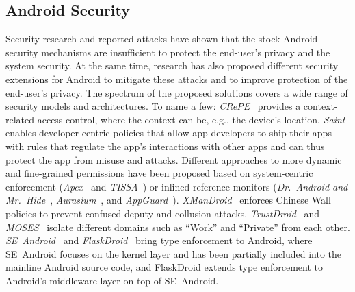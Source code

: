 \documentclass[letterpaper,twocolumn,10pt]{article}
\begin{document}
\subsection{Android Security}
\label{sec:related:androidsec}

Security research and reported attacks have shown that the stock Android security mechanisms are insufficient to protect the end-user's privacy and the system security. At the same time, research has also proposed different security extensions for Android to mitigate these attacks and to improve protection of the end-user's privacy. The spectrum of the proposed solutions covers a wide range of security models and architectures. To name a few: \textit{CRePE}~\cite{CoNgCr_10:CRePE} provides a context-related access control, where the context can be, e.g., the device's location. \textit{Saint}~\cite{OnMcEnMc_09:Saint} enables developer-centric policies that allow app developers to ship their apps with rules that regulate the app's interactions with other apps and can thus protect the app from misuse and attacks. Different approaches to more dynamic and fine-grained permissions have been proposed based on system-centric enforcement (\textit{Apex}~\cite{NaKhZh_10:Apex} and \textit{TISSA}~\cite{tissa11}) or inlined reference monitors (\textit{Dr.~Android and Mr.~Hide}~\cite{Jeon2012}, \textit{Aurasium}~\cite{Xu2012a}, and \textit{AppGuard}~\cite{backes13TACAS}). \textit{XManDroid}~\cite{BuDaDm_12:TowardsT} enforces Chinese Wall policies to prevent confused deputy and collusion attacks. \textit{TrustDroid}~\cite{trustdroid} and \textit{MOSES}~\cite{Russello:2012:MSO:2295136.2295140} isolate different domains such as ``Work'' and ``Private'' from each other. \textit{SE~Android}~\cite{Smalley2013} and \textit{FlaskDroid}~\cite{TUD-CS-2013-0115} bring type enforcement to Android, where SE~Android focuses on the kernel layer and has been partially included into the mainline Android source code, and FlaskDroid extends type enforcement to Android's middleware layer on top of SE~Android.
 
\end{document}
